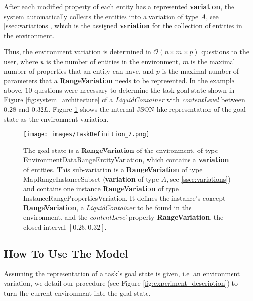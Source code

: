 After each modified property of each entity has a represented \textbf{variation}, the system automatically collects the entities into a variation of type $A$, see \ref{ssec:variations}, which is the assigned \textbf{variation} for the collection of entities in the environment.

Thus, the environment variation is determined in $\mathcal{O}\left(n\times m \times p\right)$ questions to the user, where $n$ is the number of entities in the environment, $m$ is the maximal number of properties that an entity can have, and $p$ is the maximal number of parameters that a \textbf{RangeVariation} needs to be represented. In the example above, $10$ questions were necessary to determine the task goal state shown in Figure \ref{fig:system_architecture} of a \textit{LiquidContainer} with \textit{contentLevel} between $0.28$ and $0.32L$. Figure \ref{fig:task_goal_state} shows the internal JSON-like representation of the goal state as the environment variation.

\begin{figure}[t!]
    \centering
    \texttt{[image: images/TaskDefinition\_7.png]}
    \caption{The goal state is a \textbf{RangeVariation} of the environment, of type EnvironmentDataRangeEntityVariation, which contains a \textbf{variation} of entities. This sub-variation is a \textbf{RangeVariation} of type MapRangeInstanceSubset (\textbf{variation} of type $A$, see \ref{ssec:variations}) and contains one instance \textbf{RangeVariation} of type InstanceRangePropertiesVariation. It defines the instance's concept \textbf{RangeVariation}, a \textit{LiquidContainer} to be found in the environment, and the \textit{contentLevel} property \textbf{RangeVariation}, the closed interval $\left[0.28, 0.32\right]$.} \label{fig:task_goal_state}
\end{figure}

\subsection{How To Use The Model}\label{ssec:exp_model_use}
Assuming the representation of a task's goal state is given, i.e. an environment variation, we detail our procedure (see Figure \ref{fig:experiment_description}) to turn the current environment into the goal state.

